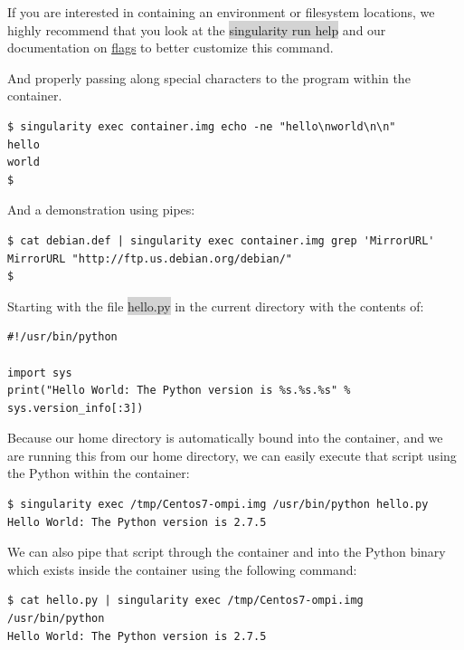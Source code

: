 \documentclass[a4paper]{article}
\newcounter{subsubsubsection}[subsubsection]
\begin{document}
	
	If you are interested in containing an environment or filesystem locations, we highly recommend that you look at the  \colorbox{lightgray}{singularity run help} and our documentation on \href{http://singularity.lbl.gov/action-flags}{flags} to better customize this command.
	
	
	
	And properly passing along special characters to the program within the container.
\begin{lstlisting}[frame=single]
$ singularity exec container.img echo -ne "hello\nworld\n\n"
hello
world
$ 
\end{lstlisting}	

And a demonstration using pipes:\\[0.1in]

\begin{lstlisting}[frame=single]
$ cat debian.def | singularity exec container.img grep 'MirrorURL'
MirrorURL "http://ftp.us.debian.org/debian/"
$ 
\end{lstlisting}

	Starting with the file \colorbox{lightgray}{hello.py} in the current directory with the contents of:
	
\begin{lstlisting}[frame=single]
#!/usr/bin/python

import sys
print("Hello World: The Python version is %s.%s.%s" % sys.version_info[:3])
\end{lstlisting}
	
Because our home directory is automatically bound into the container, and we are running this from our home directory, we can easily execute that script using the Python within the container:

\begin{lstlisting}[frame=single]
$ singularity exec /tmp/Centos7-ompi.img /usr/bin/python hello.py 
Hello World: The Python version is 2.7.5
\end{lstlisting}

We can also pipe that script through the container and into the Python binary which exists inside the container using the following command:

\begin{lstlisting}[frame=single]
$ cat hello.py | singularity exec /tmp/Centos7-ompi.img /usr/bin/python 
Hello World: The Python version is 2.7.5
\end{lstlisting}
\end{document}
